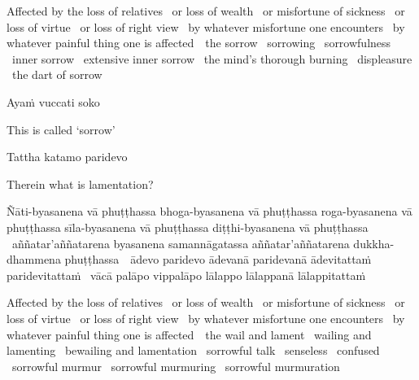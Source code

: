 \begin{english-hang-verses}
  Affected by the loss of relatives \breathmark\ or loss of wealth \breathmark\ or misfortune of sickness \breathmark\ or loss of virtue \breathmark\ or loss of right view\makeatletter\hyperlink{endnote84-appendix}\makeatother
  \breathmark\ by whatever misfortune one encounters \breathmark\ by whatever painful thing one is \mbox{affected}~\breathmark\ the sorrow \breathmark\ sorrowing \breathmark\ sorrowfulness \breathmark\ inner sorrow \breathmark\ extensive inner sorrow \breathmark\ the mind's thorough burning \breathmark\ displeasure \breathmark\ the dart of sorrow
\end{english-hang-verses}

Ayaṁ vuccati soko

\begin{english}
  This is called `sorrow'
\end{english}

Tattha katamo paridevo

\begin{english}
  Therein what is lamentation?
\end{english}

\begin{pali-hang}
  Ñāti-byasanena vā phuṭṭhassa bhoga-byasanena vā phuṭṭhassa roga-byasanena vā phuṭṭhassa sīla-byasanena vā phuṭṭhassa diṭṭhi-byasanena vā phuṭṭhassa \breathmark\ aññatar'aññatarena byasanena samannāgatassa aññatar'aññatarena dukkha-dhammena \mbox{phuṭṭhassa}~\breathmark\ ādevo paridevo ādevanā paridevanā ādevitattaṁ paridevitattaṁ \breathmark\ vācā palāpo vippalāpo lālappo lālappanā lālappitattaṁ
\end{pali-hang}

\begin{english-hang-verses}
  Affected by the loss of relatives \breathmark\ or loss of wealth \breathmark\ or misfortune of sickness \breathmark\ or loss of virtue \breathmark\ or loss of right view \breathmark\ by whatever misfortune one encounters \breathmark\ by whatever painful thing one is \mbox{affected}~\breathmark\ the wail and lament \breathmark\ wailing and lamenting \breathmark\ bewailing and lamentation \breathmark\ sorrowful talk \breathmark\ senseless \breathmark\ confused \breathmark\ sorrowful murmur \breathmark\ sorrowful murmuring \breathmark\ sorrowful murmuration
\end{english-hang-verses}

